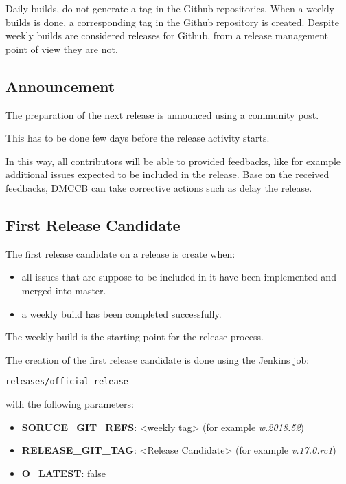 Daily builds, do not generate a tag in the Github repositories. 
When a weekly builds is done, a corresponding tag in the Github repository is created.
Despite weekly builds are considered releases for Github, from a release management point of view they are not.

 
\subsection{Announcement} \label{sect:anaouncement}

The preparation of the next release is announced using a community post.

This has to be done few days before the release activity starts.

In this way, all contributors will be able to provided feedbacks, like for example additional issues expected to be included in the release.
Base on the received feedbacks, DMCCB can take corrective actions such as delay the release.


\subsection{First Release Candidate} \label{sect:firstrc}

The first release candidate on a release is create when:

\begin{itemize}
\item all issues that are suppose to be included in it have been implemented and merged into master.
\item a weekly build has been completed successfully.
\end{itemize}

The weekly build is the starting point for the release process.

The creation of the first release candidate is done using the Jenkins job:

\begin{verbatim}
releases/official-release 
\end{verbatim}

with the following parameters:

\begin{itemize}
\item {\bf SORUCE\_GIT\_REFS}: <weekly tag> (for example \textit{w.2018.52})
\item {\bf RELEASE\_GIT\_TAG}: <Release Candidate> (for example \textit{v.17.0.rc1})
\item {\bf O\_LATEST}: false
\end{itemize}


